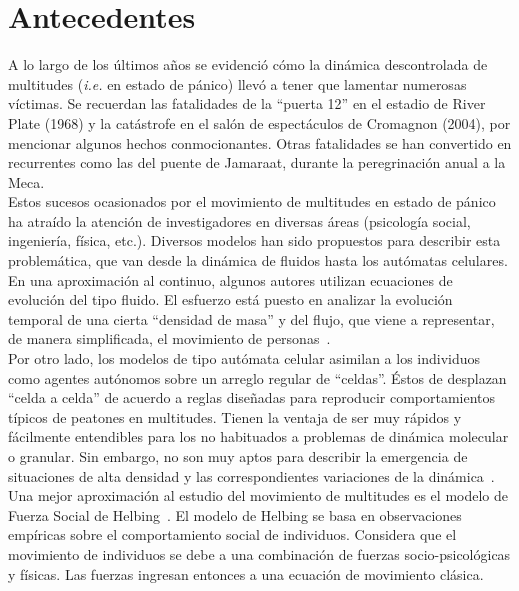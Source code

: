 \section{Antecedentes}

A lo largo de los últimos años se evidenció cómo la dinámica descontrolada de multitudes (\emph{i.e.} en estado de pánico) llevó a tener que lamentar numerosas víctimas. Se recuerdan las fatalidades  de  la “puerta 12” en el estadio de River Plate (1968) y la catástrofe en el salón de espectáculos de Cromagnon (2004), por mencionar algunos hechos conmocionantes. Otras fatalidades se han convertido en recurrentes como las del puente de Jamaraat, durante la peregrinación anual a la  Meca. \\   

\noindent Estos sucesos ocasionados por el movimiento de multitudes en estado de pánico ha atraído la atención de investigadores en diversas áreas (psicología social, ingeniería, física, etc.). Diversos modelos han sido propuestos para describir esta problemática, que van desde la dinámica de fluidos hasta los autómatas celulares.\\

\noindent En una aproximación al continuo, algunos autores utilizan ecuaciones de evolución del tipo fluido.  El esfuerzo está puesto en analizar la evolución temporal de una cierta “densidad de masa” y del  flujo, que viene a representar, de manera simplificada, el movimiento de personas~\cite{bruno}. \\

\noindent Por otro lado, los modelos de tipo autómata celular asimilan a los individuos como agentes autónomos sobre un arreglo regular de “celdas”. Éstos de desplazan “celda a celda” de acuerdo a reglas diseñadas para reproducir comportamientos típicos de peatones en multitudes. Tienen la ventaja de ser muy rápidos y fácilmente entendibles para los no habituados a problemas de dinámica molecular o granular. Sin embargo, no son muy aptos para describir la emergencia de situaciones de alta densidad y las correspondientes variaciones de la dinámica~\cite{blue}.\\

\noindent Una mejor aproximación al estudio del movimiento de multitudes es el modelo de Fuerza Social de Helbing~\cite{Helbing1}. El modelo de Helbing se basa en observaciones empíricas sobre el comportamiento social de individuos. Considera que el movimiento de individuos se debe a una combinación de fuerzas socio-psicológicas y físicas. Las fuerzas ingresan entonces a una ecuación de movimiento clásica. \\

